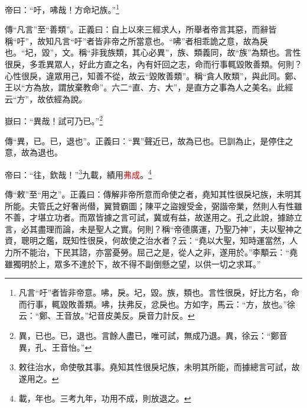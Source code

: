 帝曰：“吁，咈哉！方命圮族。”\footnote{凡言“吁”者皆非帝意。咈，戾。圮，毀。族，類也。言性很戾，好比方名，命而行事，輒毀敗善類。咈，扶弗反，忿戾也。方如字，馬云：“方，放也。”徐云：“鄭、王音放。”圮音皮美反。戾音力計反。}

{\noindent\zhuan{}\fzbyks 傳“凡言”至“善類”。正義曰：自上以來三經求人，所舉者帝言其惡，而辭皆稱“吁”，故知凡言“吁”者皆非帝之所當意也。“咈”者相乖詭之意，故為戾也。“圮，毀”，文。稱“非我族類，其心必異”，族、類義同，故“族”為類也。言性很戾，多乖異眾人，好此方直之名，內有奸回之志，命而行事輒毀敗善類。何則？心性很戾，違眾用己，知善不從，故云“毀敗善類”。稱“貪人敗類”，與此同。鄭、王以“方為放，謂放棄教命”。六二“直、方、大”，是直方之事為人之美名。此經云“方”，故依經為說。 \par}

嶽曰：“異哉！試可乃已。”\footnote{異，已也。已，退也。言餘人盡已，唯可試，無成乃退。異，徐云：“鄭音異，孔、王音怡。”}

{\noindent\zhuan{}\fzbyks 傳“異，已。已，退也”。正義曰：“異”聲近已，故為已也。已訓為止，是停住之意，故為退也。 \par}

帝曰：“往，欽哉！”\footnote{敕往治水，命使敬其事。堯知其性很戾圮族，未明其所能，而據總言可試，故遂用之。}九載，績用\textcolor{red}{弗成}。\footnote{載，年也。三考九年，功用不成，則放退之。}

{\noindent\zhuan{}\fzbyks 傳“敕”至“用之”。正義曰：傳解非帝所意而命使之者，堯知其性很戾圮族，未明其所能。夫管氏之好奢尚僣，翼贊霸圖；陳平之盜嫂受金，弼諧帝業，然則人有性雖不善，才堪立功者。而眾皆據之言可試，冀或有益，故遂用之。孔之此說，據跡立言，必其盡理而論，未是聖人之實。何則？稱“帝德廣運，乃聖乃神”，夫以聖神之資，聰明之鑑，既知性很戾，何故使之治水者？云：“堯以大聖，知時運當然，人力所不能治，下民其諮，亦當憂勞。屈己之是，從人之非，遂用於。”李顒云：“堯雖獨明於上，眾多不達於下，故不得不副倒懸之望，以供一切之求耳。” \par}


